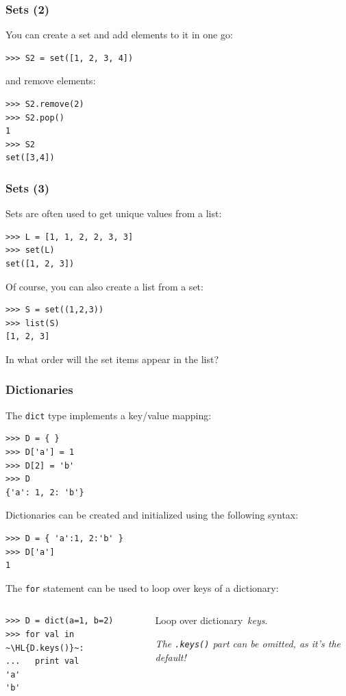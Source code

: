 \documentclass[english,serif,mathserif,xcolor=pdftex,dvipsnames,table]{beamer}
\begin{document}
\begin{frame}[fragile]
  \frametitle{Sets (2)}
You can create a set and add elements to it in one go:
\begin{lstlisting}
>>> S2 = set([1, 2, 3, 4])
\end{lstlisting}

and remove elements:

\begin{lstlisting}
>>> S2.remove(2)
>>> S2.pop()
1
>>> S2
set([3,4])
\end{lstlisting}
\end{frame}

\begin{frame}[fragile]
  \frametitle{Sets (3)}
  Sets are often used to get unique values from a list:
  \begin{lstlisting}
>>> L = [1, 1, 2, 2, 3, 3]
>>> set(L)
set([1, 2, 3])
 \end{lstlisting}

\+\pause
Of course, you can also create a list from a set:
\begin{lstlisting}
>>> S = set((1,2,3))
>>> list(S)
[1, 2, 3]
\end{lstlisting}

\+\pause
\begin{question}
  In what order will the set items appear in the list?
\end{question}

\end{frame}


\begin{frame}[fragile]
  \frametitle{Dictionaries}
  The \texttt{dict} type implements a key/value mapping:
\begin{lstlisting}
>>> D = { }
>>> D['a'] = 1
>>> D[2] = 'b'
>>> D
{'a': 1, 2: 'b'}
\end{lstlisting}

  \+\pause
  Dictionaries can be created and initialized using the following syntax:
\begin{lstlisting}
>>> D = { 'a':1, 2:'b' }
>>> D['a']
1
\end{lstlisting}

\end{frame}

\begin{frame}[fragile]
  The \texttt{for} statement can be used to loop over keys of a dictionary:
  \+
  \begin{columns}[c]
    \begin{column}{0.5\textwidth}
\begin{lstlisting}
>>> D = dict(a=1, b=2)
>>> for val in ~\HL{D.keys()}~:
...   print val
'a'
'b'
\end{lstlisting}
    \end{column}
    \begin{column}{0.4\textwidth}
      \raggedleft
      Loop over dictionary~\emph{keys}.

      \emph{The \texttt{.keys()} part can be omitted, as it's the
        default!}
    \end{column}
  \end{columns}
\end{frame}
\end{document}
